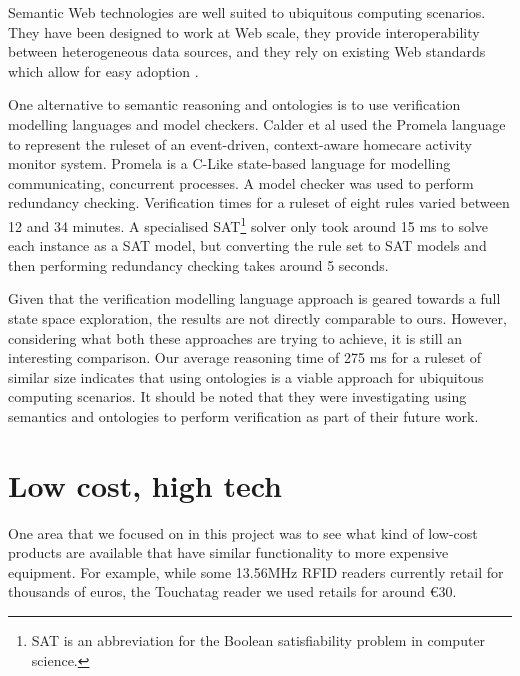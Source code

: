 Semantic Web technologies are well suited to ubiquitous computing scenarios. They have been designed to work at Web scale, they provide interoperability between heterogeneous data sources, and they rely on existing Web standards which allow for easy adoption \cite{Sabou2010}.

One alternative to semantic reasoning and ontologies is to use verification modelling languages and model checkers. Calder et al \cite{Calder2009} used the Promela language to represent the ruleset of an event-driven, context-aware homecare activity monitor system. Promela is a C-Like state-based language for modelling communicating, concurrent processes. A model checker was used to perform redundancy checking. Verification times for a ruleset of eight rules varied between 12 and 34 minutes. A specialised SAT\footnote{SAT is an abbreviation for the Boolean satisfiability problem in computer science.} solver only took around 15 ms to solve each instance as a SAT model, but converting the rule set to SAT models and then performing redundancy checking takes around 5 seconds.

Given that the verification modelling language approach is geared towards a full state space exploration, the results are not directly comparable to ours. However, considering what both these approaches are trying to achieve, it is still an interesting comparison.
 Our average reasoning time of 275 ms for a ruleset of similar size indicates that using ontologies is a viable approach for ubiquitous computing scenarios. It should be noted that they were investigating using semantics and ontologies to perform verification as part of their future work.




\section{Low cost, high tech}

One area that we focused on in this project was to see what kind of low-cost products are available that have similar functionality to more expensive equipment. For example, while some 13.56MHz \ac{RFID} readers currently retail for thousands of euros, the Touchatag reader we used retails for around \euro 30.  


